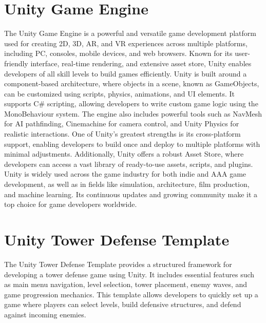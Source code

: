 \documentclass[12pt,a4paper]{report}
\begin{document}
\section{Unity Game Engine}
The Unity Game Engine is a powerful and versatile game development platform used for creating 2D, 3D, AR, and VR experiences across multiple platforms, including PC, consoles, mobile devices, and web browsers. Known for its user-friendly interface, real-time rendering, and extensive asset store, Unity enables developers of all skill levels to build games efficiently. Unity is built around a component-based architecture, where objects in a scene, known as GameObjects, can be customized using scripts, physics, animations, and UI elements. It supports C\# scripting, allowing developers to write custom game logic using the MonoBehaviour system. The engine also includes powerful tools such as NavMesh for AI pathfinding, Cinemachine for camera control, and Unity Physics for realistic interactions. One of Unity’s greatest strengths is its cross-platform support, enabling developers to build once and deploy to multiple platforms with minimal adjustments. Additionally, Unity offers a robust Asset Store, where developers can access a vast library of ready-to-use assets, scripts, and plugins. Unity is widely used across the game industry for both indie and AAA game development, as well as in fields like simulation, architecture, film production, and machine learning. Its continuous updates and growing community make it a top choice for game developers worldwide.

\section{Unity Tower Defense Template}
The Unity Tower Defense Template provides a structured framework for developing a tower defense game using Unity. It includes essential features such as main menu navigation, level selection, tower placement, enemy waves, and game progression mechanics. This template allows developers to quickly set up a game where players can select levels, build defensive structures, and defend against incoming enemies.

\end{document}

